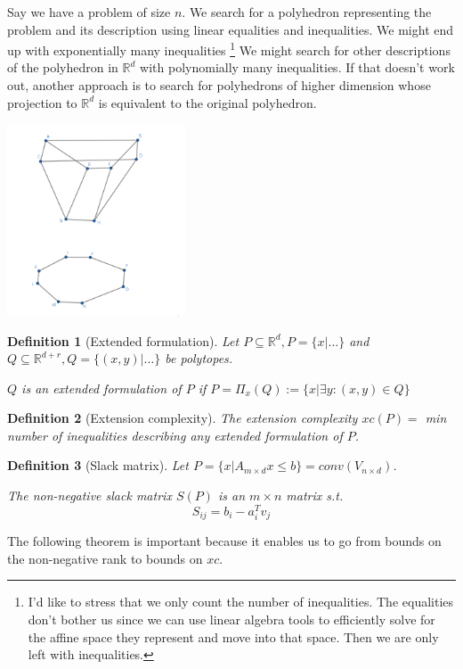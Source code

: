 \documentclass{article}
\newtheorem*{definition}{Definition}
\newcommand{\R}{\mathbb{R}}
\begin{document}
Say we have a problem of size $n$. We search for a polyhedron representing the
problem and its description using linear equalities and inequalities. We might
end up with exponentially many inequalities \footnote{I'd like to stress that
we only count the number of inequalities. The equalities don't bother us since
we can use linear algebra tools to efficiently solve for the affine space they
represent and move into that space. Then we are only left with inequalities.}
We might search for other descriptions of the polyhedron in $\R^d$ with
polynomially many inequalities. If that doesn't work out, another approach is
to search for polyhedrons of higher dimension whose projection to $\R^d$ is
equivalent to the original polyhedron.


\includegraphics[width=200px]{extended-formulation.png}

\begin{definition}[Extended formulation]
	Let $P \subseteq \R^d, P = \{x | \hdots\}$ and $Q \subseteq \R^{d + r},
	Q = \{(x, y) | \hdots\}$ be polytopes.

	$Q$ is an extended formulation of $P$ if $P = \Pi_x(Q) := \{ x |
	\exists y: (x, y) \in Q\}$
\end{definition}

\begin{definition}[Extension complexity]
	The \emph{extension complexity} $xc(P) =$ min number of inequalities
	describing any extended formulation of $P$.
\end{definition}

\begin{definition}[Slack matrix]
	Let $P = \{x|A_{m \times d}x \le b\} = conv(V_{n \times d})$.

	The non-negative \emph{slack matrix} $S(P)$ is an $m \times n$ matrix
	s.t.
	$$
	S_{ij} = b_i - a_i^Tv_j
	$$
\end{definition}

The following theorem is important because it enables us to go from bounds on
the non-negative rank to bounds on $xc$.
\end{document}
